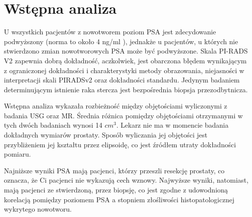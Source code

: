\documentclass[a4paper,11pt,twoside]{report}
\theoremstyle{definition}
\begin{document}
\section{Wstępna analiza}
U wszystkich pacjentów z nowotworem poziom PSA jest zdecydowanie podwyższony (norma to około 4 ng/ml \cite{norma}), jednakże u pacjentów, u których nie stwierdzono zmian nowotworowych PSA może być podwyższone. Skala PI-RADS V2 zapewnia dobrą dokładność, aczkolwiek, jest obarczona błędem wynikającym z ograniczonej dokładności i charakterystyki metody obrazowania, niejasności w interpretacji skali PIRADSv2 oraz dokładności standardu. Jedynym badaniem determinującym istnienie raka stercza jest bezpośrednia biopsja przezodbytnicza. 
\par 
Wstępna analiza wykazała rozbieżność między objętościami wyliczonymi z badania USG oraz MR. Średnia różnica pomiędzy objętościami otrzymanymi w tych dwóch badaniach wynosi 14 $cm^3$. Lekarz nie ma w momencie badania dokładnych wymiarów prostaty. Sposób wyliczania jej objętości jest przybliżeniem jej kształtu przez elipsoidę, co jest źródłem utraty dokładności pomiaru.
\par 
Najniższe wyniki PSA mają pacjenci, którzy przeszli resekcję prostaty, co oznacza, że Ci pacjenci nie wykazują cech wznowy. Najwyższe wyniki, natomiast, mają pacjenci ze stwierdzoną, przez biopsję, co jest zgodne z udowodnioną korelacją pomiędzy poziomem PSA a stopniem złośliwości histopatologicznej wykrytego nowotworu\cite{psaCorrelation}.
\end{document}
